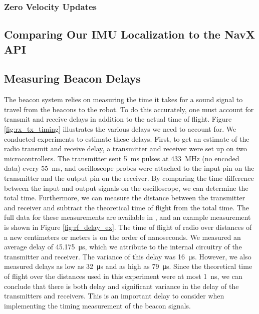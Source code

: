 \documentclass{article}
\begin{document}

    \subsubsection{Zero Velocity Updates}

  \subsection{Comparing Our IMU Localization to the NavX API}

%
  \subsection{Measuring Beacon Delays}

    The beacon system relies on measuring the time it takes for a sound signal to travel from the beacons to the robot. To do this accurately, one must account for transmit and receive delays in addition to the actual time of flight. Figure \ref{fig:rx_tx_timing} illustrates the various delays we need to account for. We conducted experiments to estimate these delays. First, to get an estimate of the radio transmit and receive delay, a transmitter and receiver were set up on two microcontrollers. The transmitter sent \SI{5}{\milli\second} pulses at \SI{433}{\mega\hertz} (no encoded data) every \SI{55}{\milli\second}, and oscilloscope probes were attached to the input pin on the transmitter and the output pin on the receiver. By comparing the time difference between the input and output signals on the oscilloscope, we can determine the total time. Furthermore, we can measure the distance between the transmitter and receiver and subtract the theoretical time of flight from the total time. The full data for these measurements are available in , and an example measurement is shown in Figure \ref{fig:rf_delay_ex}. The time of flight of radio over distances of a new centimeters or meters is on the order of nanoseconds. We measured an average delay of \SI{45.175}{\micro\second}, which we attribute to the internal circuitry of the transmitter and receiver. The variance of this delay was \SI{16}{\micro\second}. However, we also measured delays as low as \SI{32}{\micro\second} and as high as \SI{79}{\micro\second}. Since the theoretical time of flight over the distances used in this experiment were at most \SI{1}{\nano\second}, we can conclude that there is both delay and significant variance in the delay of the transmitters and receivers. This is an important delay to consider when implementing the timing measurement of the beacon signals.
\end{document}
